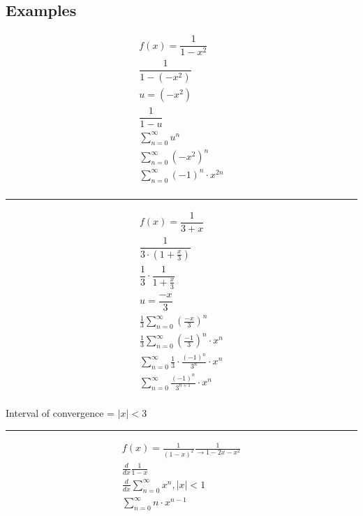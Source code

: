 \documentclass{article}
\begin{document}
\subsection*{Examples}
\begin{equation}
\begin{aligned}
f(x)=\dfrac{1}{1-x^2}\\
\dfrac{1}{1-(-x^2)}\\
u=(-x^2)\\
\dfrac{1}{1-u}\\
\displaystyle \sum^\infty_{n=0}u^n\\
\displaystyle \sum^\infty_{n=0}(-x^2)^n\\
\displaystyle \sum^\infty_{n=0}(-1)^n \cdot x^{2n}\\
\end{aligned}
\end{equation}
\hrule
\begin{equation}
\begin{aligned}
f(x)=\dfrac{1}{3+x}\\
\dfrac{1}{3\cdot (1+\frac{x}{3})}\\
\dfrac{1}{3} \cdot \dfrac{1}{1+\frac{x}{3}}\\
u=\dfrac{-x}{3}\\
\displaystyle \frac{1}{3}\sum^\infty_{n=0}\left(\frac{-x}{3}\right)^n\\
\displaystyle \frac{1}{3}\sum^\infty_{n=0}\left(\frac{-1}{3}\right)^n \cdot x^n\\
\displaystyle\sum^\infty_{n=0} \frac{1}{3} \cdot \frac{(-1)^n}{3^n} \cdot x^n\\
\displaystyle \sum^\infty_{n=0}\frac{(-1)^n}{3^{n+1}} \cdot x^n\\
\end{aligned}
\end{equation}
\begin{center}
Interval of convergence = $|x|<3$
\end{center}
\hrule
\begin{equation}
\begin{aligned}
f(x)=\frac{1}{(1-x)^2}\frac{1}{\rightarrow 1-2x-x^2}\\
\frac{d}{dx}\frac{1}{1-x}\\
\frac{d}{dx}\displaystyle\sum^\infty_{n=0}x^n,|x|<1\\
\sum^\infty_{n=0}n \cdot x^{n-1}
\end{aligned}
\end{equation}
\end{document}
